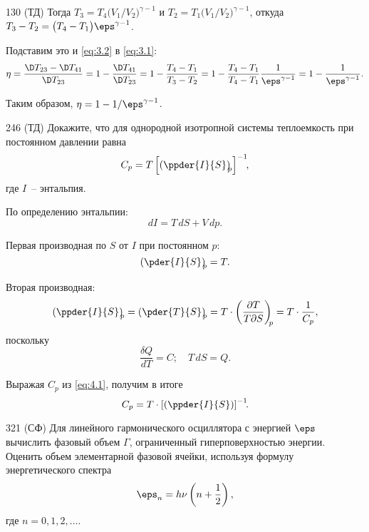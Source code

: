 \documentclass[pscyr]{hedwork}
\begin{document}
\begin{task}{130 (ТД)}
    Тогда \( T_3 = T_4 \bigl(V_1 / V_2\big)^{\gamma - 1} \) и
    \( T_2 = T_1 \bigl(V_1 / V_2\big)^{\gamma - 1} \), откуда
    \( T_3 - T_2 = \bigl(T_4 - T_1\big)\eps^{\gamma - 1} \).

    Подставим это и \eqref{eq:3.2} в \eqref{eq:3.1}:
    \[
      \eta = \frac{\D T_{23} - \D T_{41}}{\D T_{23}} =
        1 - \frac{\D T_{41}}{\D T_{23}} = 1 - \frac{T_4 - T_1}{T_3 - T_2} =
        1 - \frac{T_4 - T_1}{T_4 - T_1}\frac{1}{\eps^{\gamma - 1}} =
        1 - \frac{1}{\eps^{\gamma - 1}}.
    \]

    Таким образом, \( \eta = 1 - 1 / \eps^{\gamma - 1} \).

  \end{task}

  \begin{task}{246 (ТД)}{
    Докажите, что для однородной изотропной системы теплоемкость при постоянном
    давлении равна
    \[
      C_p = T\left[\left(\ppder{I}{S}\right)_{\!\!p}\right]^{-1} \!\!,
    \]
    где \( I \)~-- энтальпия.
  }

    По определению энтальпии:
    \[
      dI = T\,dS + V\,dp.
    \]

    Первая производная по \( S \) от \( I \) при постоянном \( p \):
    \[
      \left(\pder{I}{S}\right)_{\!\!p} = T.
    \]

    Вторая производная:
    \begin{equation}
      \left(\ppder{I}{S}\right)_{\!\!p} = \left(\pder{T}{S}\right)_{\!\!p} =
        T \cdot \left(\frac{\partial T}{T\partial S}\right)_{\!\!p} =
        T \cdot \frac{1}{C_p},
      \label{eq:4.1}
    \end{equation}
    поскольку
    \[
      \frac{\delta Q}{dT} = C; \quad T\,dS = Q.
    \]

    Выражая \( C_p \) из \eqref{eq:4.1}, получим в итоге
    \[
      C_p = T \cdot \left[\left(\ppder{I}{S}\right)\right]^{-1}\!\!.
    \]

  \end{task}

  \begin{task}{321 (СФ)}{
    Для линейного гармонического осциллятора с энергией \( \eps \) вычислить
    фазовый объем \( \Gamma \), ограниченный гиперповерхностью энергии. Оценить
    объем элементарной фазовой ячейки, используя формулу энергетического спектра
    \[
      \eps_n = h\nu \left(n + \frac{1}{2}\right),
    \]
    где \( n = 0, 1, 2, \ldots \).
  }

  \end{task}
\end{document}

